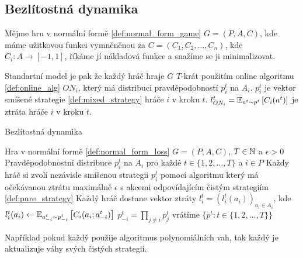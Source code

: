 \subsection{Bezlítostná dynamika}
\begin{definition}
\label{def:normal_form_loss}
Mějme hru v normální formě \ref{def:normal_form_game} $G = (P,A,C)$, kde máme užitkovou funkci vymněněnou za $C = (C_1,C_2,\dots,C_n)$, kde $C_i: A \rightarrow [-1,1]$, říkáme jí nákladová funkce a snažíme se ji minimalizovat. 
\end{definition}
Standartní model je pak že každý hráč hraje $G$ $T$-krát použitím online algoritmu \ref{def:online_alg} $ON_i$, který má distribuci pravděpodobností $p^t_i$ na $A_i$. 
$p^t_i$ je vektor smíšené strategie \ref{def:mixed_strategy} hráče $i$ v kroku $t$. 
$l^t_{ON_i} = \E[a^t \sim p^t]{C_i(a^t)}$ je ztráta hráče $i$ v kroku $t$. 

\begin{algorithm}
    \algrenewcommand{}
    \algrenewcommand{}
    \caption{Bezlítostná dynamika}
    \label{alg:no_regrets}
    \begin{algorithmic}[1]
        \Require Hra v normální formě \ref{def:normal_form_loss} $G= (P,A,C)$, $T\in \N$ a $\epsilon >0$
        \Ensure Pravděpodobnostní distribuce $p^t_i$ na $A_i$ pro každé $t \in \{1,2,\dots, T\}$ a $i \in P$ 
            \State Každy hráč si zvolí nezávisle smíšenou strategii $p^t_i$ pomocí algoritmu který má očekávanou ztrátu maximálně $\epsilon$ s akcemi odpovídajícím čistým strategiím \ref{def:pure_strategy}
            \State Každý hráč dostane vektor ztráty $l^t_i = (l_i^t(a_i))_{a_i \in A_i}$, kde $l^t_i(a_i) \leftarrow \E[a_{-i}^t \sim p_{-i}^t]{C_i(a_i;a^t_{-i})}$
            \State $p^t_{-i} = \prod_{j \neq i} p_j^t$
        \EndFor
        \State vrátíme $\{p^t: t\in \{1,2,\dots,T\}\}$
    \end{algorithmic}
\end{algorithm}
Například pokud každý použije algoritmus polynomiálních vah, tak každý je aktualizuje váhy svých čistých strategií. 

